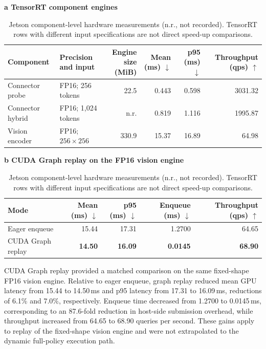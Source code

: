\begin{table}
  \centering
  \caption{Jetson component-level hardware measurements (n.r., not
  recorded). TensorRT rows with different input specifications are not direct
  speed-up comparisons.}
  \label{tab:jetson_hardware}
  \small
  \setlength{\tabcolsep}{4pt}
  \textbf{a \quad TensorRT component engines}\\[-2pt]
  \begin{tabular}{@{}llrrrr@{}}
    \toprule
    Component & Precision and input &
    \shortstack{Engine size\\(MiB)} &
    \shortstack{Mean\\(ms) \(\downarrow\)} &
    \shortstack{p95\\(ms) \(\downarrow\)} &
    \shortstack{Throughput\\(qps) \(\uparrow\)} \\
    \midrule
    Connector probe & FP16; 256 tokens & 22.5 & 0.443 & 0.598 & 3031.32 \\
    Connector hybrid & FP16; 1,024 tokens & n.r. & 0.819 & 1.116 & 1995.87 \\
    Vision encoder & FP16; \(256\times256\) & 330.9 & 15.37 & 16.89 & 64.98 \\
    \bottomrule
  \end{tabular}

  \vspace{4pt}
  \textbf{b \quad CUDA Graph replay on the FP16 vision engine}\\[-2pt]
  \begin{tabular}{@{}lrrrr@{}}
    \toprule
    Mode &
    \shortstack{Mean\\(ms) \(\downarrow\)} &
    \shortstack{p95\\(ms) \(\downarrow\)} &
    \shortstack{Enqueue\\(ms) \(\downarrow\)} &
    \shortstack{Throughput\\(qps) \(\uparrow\)} \\
    \midrule
    Eager enqueue & 15.44 & 17.31 & 1.2700 & 64.65 \\
    CUDA Graph replay & \textbf{14.50} & \textbf{16.09} & \textbf{0.0145} & \textbf{68.90} \\
    \bottomrule
  \end{tabular}
\end{table}

CUDA Graph replay provided a matched comparison on the same fixed-shape FP16
vision engine. Relative to eager enqueue, graph replay reduced mean GPU latency
from 15.44 to 14.50\,ms and p95 latency from 17.31 to 16.09\,ms, reductions of
6.1\% and 7.0\%, respectively. Enqueue time decreased from 1.2700 to
0.0145\,ms, corresponding to an 87.6-fold reduction in host-side submission
overhead, while throughput increased from 64.65 to 68.90 queries per second.
These gains apply to replay of the fixed-shape vision engine and were not
extrapolated to the dynamic full-policy execution path.

